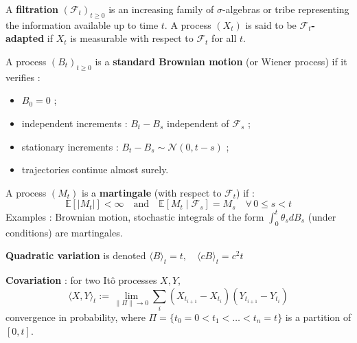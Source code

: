 \begin{f}
	
A \textbf{filtration} \((\mathcal{F}_t)_{t \geq 0}\) is an increasing family of \(\sigma\)-algebras or tribe representing the information available up to time \(t\). A process \((X_t)\) is said to be \textbf{\(\mathcal{F}_t\)-adapted} if \(X_t\) is measurable with respect to \(\mathcal{F}_t\) for all \(t\).
	
A process \((B_t)_{t \geq 0}\) is a \textbf{standard Brownian motion} (or Wiener process) if it verifies :
	\begin{itemize} 
		\item \(B_0 = 0\) ;
		\item independent increments : \(B_t - B_s\)  independent of \(\mathcal{F}_s\) ;
		\item stationary increments : \(B_t - B_s \sim \mathcal{N}(0, t - s)\) ;
		\item trajectories continue almost surely.
	\end{itemize}
	
	A process \((M_t)\) is a \textbf{martingale} (with respect to \(\mathcal{F}_t\)) if :
	\[
	\mathbb{E}[|M_t|] < \infty \quad \text{and} \quad \mathbb{E}[M_t \mid \mathcal{F}_s] = M_s \quad \forall\, 0 \leq s < t
	\]
	Examples : Brownian motion, stochastic integrals of the form \(\int_0^t \theta_s dB_s\) (under conditions) are martingales.
	\medskip
	
	\textbf{Quadratic variation} is denoted \(
	\langle B \rangle_t = t, \quad \langle cB \rangle_t = c^2 t\)
	
\textbf{Covariation} : for two Itô processes \(X, Y\),
\[
\langle X, Y \rangle_t := \lim_{\|\Pi\| \to 0} \sum_{i} (X_{t_{i+1}} - X_{t_i})(Y_{t_{i+1}} - Y_{t_i})
\]
convergence in probability, where \(\Pi = \{t_0 = 0 < t_1 < \dots < t_n = t\}\) is a partition of \([0,t]\).
\end{f}


